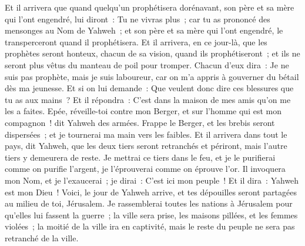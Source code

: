 \begin{multicols}{2}
Et il arrivera que quand quelqu'un prophétisera dorénavant, son père et sa mère qui l'ont engendré, lui diront~: Tu ne vivras plus~; car tu as prononcé des mensonges au Nom de Yahweh~; et son père et sa mère qui l'ont engendré, le transperceront quand il prophétisera.
Et il arrivera, en ce jour-là, que les prophètes seront honteux, chacun de sa vision, quand ils prophétiseront~; et ils ne seront plus vêtus du manteau de poil pour tromper.
Chacun d'eux dira~: Je ne suis pas prophète, mais je suis laboureur, car on m'a appris à gouverner du bétail dès ma jeunesse.
Et si on lui demande~: Que veulent donc dire ces blessures que tu as aux mains~? Et il répondra~: C'est dans la maison de mes amis qu'on me les a faites.
Epée, réveille-toi contre mon Berger, et sur l'homme qui est mon compagnon~! dit Yahweh des armées. Frappe le Berger, et les brebis seront dispersées~; et je tournerai ma main vers les faibles.
Et il arrivera dans tout le pays, dit Yahweh, que les deux tiers seront retranchés et périront, mais l'autre tiers y demeurera de reste.
Je mettrai ce tiers dans le feu, et je le purifierai comme on purifie l'argent, je l'éprouverai comme on éprouve l'or. Il invoquera mon Nom, et je l'exaucerai~; je dirai~: C'est ici mon peuple~! Et il dira~: Yahweh est mon Dieu~!
\VerseOne{}Voici, le jour de Yahweh arrive, et tes dépouilles seront partagées au milieu de toi, Jérusalem.
Je rassemblerai toutes les nations à Jérusalem pour qu'elles lui fassent la guerre~; la ville sera prise, les maisons pillées, et les femmes violées~; la moitié de la ville ira en captivité, mais le reste du peuple ne sera pas retranché de la ville.

\end{multicols}
